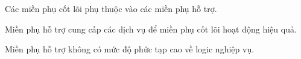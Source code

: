 






%  
Các miền phụ cốt lõi phụ thuộc vào các miền phụ hỗ trợ.




Miền phụ hỗ trợ cung cấp các dịch vụ để miền phụ cốt lõi hoạt động hiệu quả.

Miền phụ hỗ trợ không có mức độ phức tạp cao về logic nghiệp vụ.

 